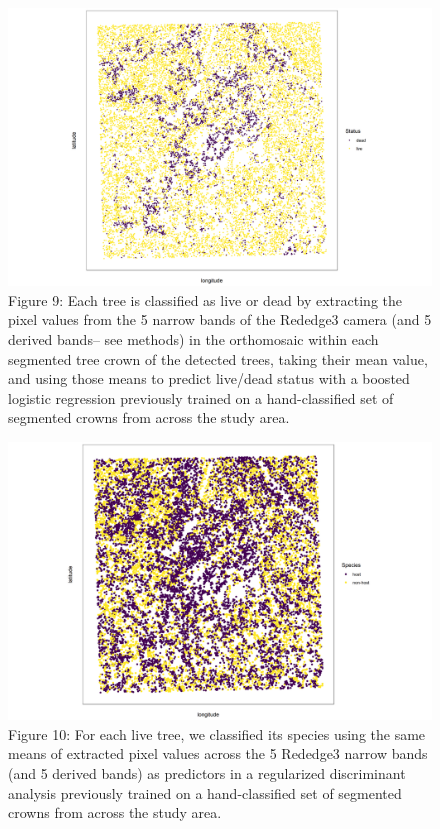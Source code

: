 \documentclass[]{article}
\begin{document}
\begin{figure}
\centering
\includegraphics{../../figures/eldo_3k_3_live_dead.png}
\caption{Figure 9: Each tree is classified as live or dead by extracting
the pixel values from the 5 narrow bands of the Rededge3 camera (and 5
derived bands-- see methods) in the orthomosaic within each segmented
tree crown of the detected trees, taking their mean value, and using
those means to predict live/dead status with a boosted logistic
regression previously trained on a hand-classified set of segmented
crowns from across the study area.}
\end{figure}

\begin{figure}
\centering
\includegraphics{../../figures/eldo_3k_3_host_nonhost.png}
\caption{Figure 10: For each live tree, we classified its species using
the same means of extracted pixel values across the 5 Rededge3 narrow
bands (and 5 derived bands) as predictors in a regularized discriminant
analysis previously trained on a hand-classified set of segmented crowns
from across the study area.}
\end{figure}
\end{document}
